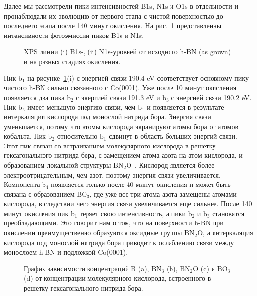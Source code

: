 Далее мы рассмотрели пики интенсивностей B1s, N1s и O1s  в отдельности и пронаблюдали их эволюцию
от первого этапа с чистой поверхностью до последнего этапа после 140 минут окисления. 
На рис.~\ref{pic:B1s_N1s} представленны интенсивности фотоэмиссии пиков B1s и N1s.
\begin{figure}[!ht]
\caption{XPS линии (i) B1s-, (ii) N1s-уровней от исходного h-BN (as grown) и на разных стадиях окисления.}
\label{pic:B1s_N1s}
\end{figure}
Пик $\mathrm{b_1}$ на рисунке~\ref{pic:B1s_N1s}(i) с энергией связи 190.4 eV соответствует основному пику 
чистого h-BN сильно связанного с Co(0001). Уже после 10 минут окисления появляется два пика
$\mathrm{b_2}$ с энергией связи 191.3 eV и $\mathrm{b_3}$ с энергией связи 190.2 eV. Пик $\mathrm{b_3}$  имеет меньшую энергию связи,
чем $\mathrm{b_1}$ и появляется в результате интеркаляции кислорода под монослой нитрида бора. 
Энергия связи уменьшается, потому что атомы кислорода экранируют атомы бора от атомов кобальта. Пик $\mathrm{b_2}$ 
относительно $\mathrm{b_1}$ сдвинут в область больших энергий связи. Этот пик связан со встраиванием молекулярного кислорода
в решетку гексагонального нитрида бора, с замещением атома азота на атом кислорода, и образованием локальной структуры 
$\mathrm{BN_2O}$~\cite{Makarova2019_h-BN/Ni_Oxydation}. Кислород является более электроотрицательным, чем азот, поэтому энергия связи увеличивается.
Компонента $\mathrm{b_4}$ появляется только после 40 минут окисления и может
быть связана с образованием $\mathrm{BO_3}$, где уже все три атома азота замещены атомами кислорода, в следствии чего энергия связи
увеличивается еще сильнее. После 140 минут окисления пик $\mathrm{b_1}$ теряет свою интенсивность, а пики
$\mathrm{b_2}$ и $\mathrm{b_3}$ становятся преобладающими. Это говорит нам о том, что на поверхности h-BN при окислении
преимущественно образуются оксидные группы $\mathrm{BN_2O}$, а интеркаляция кислорода под монослой нитрида бора приводит
к ослаблению связи между монослоем h-BN и подложкой Co(0001).
\begin{figure}[!ht]
\caption{График зависимости концентраций B (a), $\mathrm{BN_3}$ (b), $\mathrm{BN_2O}$ (c) и $\mathrm{BO_3}$ (d) от концентрации молекулярного кислорода, встроенного в решетку гексагонального нитрида бора.}
\label{pic:B_BN3_BN2O_BO3_vs_O}
\end{figure}


